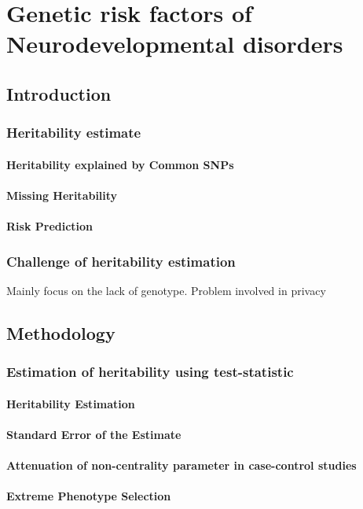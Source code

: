 \chapter{Genetic risk factors of Neurodevelopmental disorders}
\section{Introduction}
\subsection{Heritability estimate}
\subsubsection{Heritability explained by Common SNPs}
\subsubsection{Missing Heritability}
\subsubsection{Risk Prediction}
\subsection{Challenge of heritability estimation}
Mainly focus on the lack of genotype.
Problem involved in privacy
\section{Methodology}
\subsection{Estimation of heritability using test-statistic}
\subsubsection{Heritability Estimation}
\subsubsection{Standard Error of the Estimate}
\subsubsection{Attenuation of non-centrality parameter in case-control studies}
\subsubsection{Extreme Phenotype Selection}
